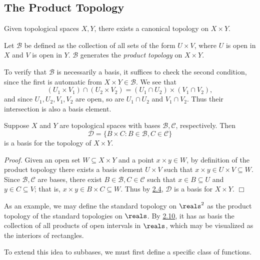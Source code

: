 \subsection{The Product Topology}
Given topological spaces $X, Y$, there exists a canonical topology on $X \times Y$.
\begin{definition}\label{2.9}
    Let $\mathcal{B}$ be defined as the collection of all sets of the form $U \times V$, where $U$ is open in $X$ and $V$ is open in $Y$. $\mathcal{B}$ generates the {\it product topology} on $X \times Y$.
\end{definition}
To verify that $\mathcal{B}$ is necessarily a basis, it suffices to check the second condition, since the first is automatic from $X \times Y \in \mathcal{B}$. We see that
$$(U_1 \times V_1) \cap (U_2 \times V_2)= (U_1 \cap U_2) \times (V_1 \cap V_2),$$
and since $U_1, U_2, V_1, V_2$ are open, so are $U_1 \cap U_2$ and $V_1 \cap V_2$. Thus their intersection is also a basis element.
\begin{theorem}\label{2.10}
    Suppose $X$ and $Y$ are topological spaces with bases $\mathcal{B}, \mathcal{C}$, respectively. Then
    $$\mathcal{D} = \{B \times C: B \in \mathcal{B}, C \in \mathcal{C}\}$$
    is a basis for the topology of $X \times Y$.
\end{theorem}
{\it Proof.} Given an open set $W \subseteq X \times Y$ and a point $x \times y \in W$, by definition of the product topology there exists a basis element $U \times V$ such that $x \times y \in U \times V \subseteq W.$ Since $\mathcal{B}, \mathcal{C}$ are bases, there exist $B \in \mathcal{B}, C \in \mathcal{C}$ such that $x \in B \subseteq U$ and $y \in C \subseteq V$; that is, $x \times y \in B \times C \subseteq W$. Thus by \hyperref[2.4]{2.4}, $\mathcal{D}$ is a basis for $X \times Y$. $\Box$

As an example, we may define the standard topology on $\reals^2$ as the product topology of the standard topologies on $\reals$. By \hyperref[2.10]{2.10}, it has as basis the collection of all products of open intervals in $\reals$, which may be visualized as the interiors of rectangles.

To extend this idea to subbases, we must first define a specific class of functions.

